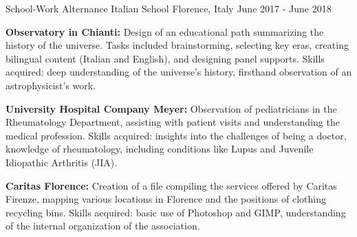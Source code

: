 \begin{cventries}
  \cventry
    {School-Work Alternance} %
    {Italian School} %
    {Florence, Italy} %
    {June 2017 - June 2018} %
    {
      \begin{cvitems} %
        \item {\textbf{Observatory in Chianti:}} Design of an educational path summarizing the history of the universe. Tasks included brainstorming, selecting key eras, creating bilingual content (Italian and English), and designing panel supports. Skills acquired: deep understanding of the universe's history, firsthand observation of an astrophysicist’s work.
        \item {\textbf{University Hospital Company Meyer:}} Observation of pediatricians in the Rheumatology Department, assisting with patient visits and understanding the medical profession. Skills acquired: insights into the challenges of being a doctor, knowledge of rheumatology, including conditions like Lupus and Juvenile Idiopathic Arthritis (JIA).
        \item {\textbf{Caritas Florence:}} Creation of a file compiling the services offered by Caritas Firenze, mapping various locations in Florence and the positions of clothing recycling bins. Skills acquired: basic use of Photoshop and GIMP, understanding of the internal organization of the association.
      \end{cvitems}
    }

\end{cventries}
